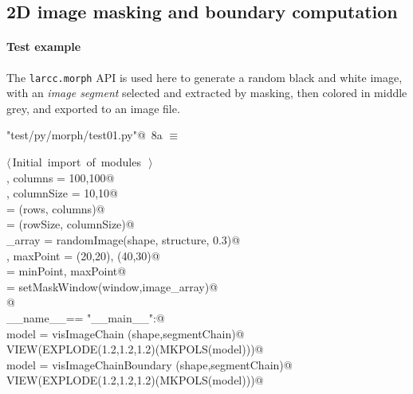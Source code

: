 \documentclass[11pt,oneside]{article}	%
\begin{document}
\subsection{2D image masking and boundary computation}

\paragraph{Test example}

The \texttt{larcc.morph} API is used here to generate a random black and white image, with an \emph{image segment} selected and extracted by masking, then colored in middle grey, and exported to an image file.  

\begin{flushleft} \small
\begin{minipage}{\linewidth} \label{scrap14}
\protect{}\verb@"test/py/morph/test01.py"@\nobreak\ {\footnotesize 8a }$\equiv$
\vspace{-1ex}
\begin{list}{}{} \item
\mbox{}\verb@@\hbox{$\langle\,$Initial import of modules\nobreak\ {\footnotesize {}}$\,\rangle$}\verb@@\\
\mbox{}\verb@rows, columns = 100,100@\\
\mbox{}\verb@rowSize, columnSize = 10,10@\\
\mbox{}\verb@shape = (rows, columns)@\\
\mbox{}\verb@structure = (rowSize, columnSize)@\\
\mbox{}\verb@image_array = randomImage(shape, structure, 0.3)@\\
\mbox{}\verb@minPoint, maxPoint = (20,20), (40,30)@\\
\mbox{}\verb@window = minPoint, maxPoint@\\
\mbox{}\verb@segmentChain = setMaskWindow(window,image_array)@\\
\mbox{}\verb@   @\\
\mbox{}\verb@if __name__== "__main__":@\\
\mbox{}\verb@   model = visImageChain (shape,segmentChain)@\\
\mbox{}\verb@   VIEW(EXPLODE(1.2,1.2,1.2)(MKPOLS(model)))@\\
\mbox{}\verb@   model = visImageChainBoundary (shape,segmentChain)@\\
\mbox{}\verb@   VIEW(EXPLODE(1.2,1.2,1.2)(MKPOLS(model)))@\\
\mbox{}\verb@@{\NWsep}
\end{list}
\vspace{-2ex}
\end{minipage}\\[4ex]
\end{flushleft}
\end{document}
